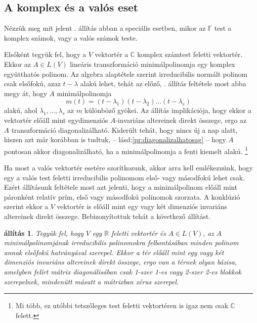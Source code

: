 \documentclass[a4paper, showtrims]{memoir}
\theoremstyle{plain}
\newtheorem{proposition}{állítás}[chapter]
\theoremstyle{remark}
\theoremstyle{definition}
\begin{document}
\subsection{A komplex és a valós eset}
Nézzük meg mit jelent . állítás abban a speciális esetben,
mikor az $\mathbb{F}$ test a komplex számok, vagy a valós számok teste.

Elsőként tegyük fel, hogy a $V$ vektortér a $\mathbb{C}$ komplex számtest feletti vektortér.
Ekkor az $A\in L\left( V \right)$ lineáris transzformáció minimálpolinomja egy komplex együtthatós polinom.
Az algebra alaptétele szerint irreducibilis normált polinom csak elsőfokú, azaz $t-\lambda$ alakú lehet,
tehát az előző, . állítás feltétele most abba megy át, hogy $A$ minimálpolinomja
\[
	m\left( t \right)=\left( t-\lambda_1 \right)\left( t-\lambda_2 \right)\dots\left( t-\lambda_s \right)
\]
alakú, ahol $\lambda_1,\ldots,\lambda_s$ az $m$ különböző gyökei.
Az állítás implikációja, hogy ekkor a vektortér előáll mint egydimenziós $A$-invariáns
altereinek direkt összege, ergo az $A$ transzformáció diagonalizálható.
Kiderült tehát, hogy nincs új a nap alatt, hiszen azt már korábban is tudtuk, -- lásd:\ref{pr:diagonalizalhatosag} -- hogy $A$ pontosan akkor diagonalizálható, ha a minimálpolinomja a fenti kiemelt alakú.%
\footnote{
    Mi több, ez utóbbi tetszőleges test feletti vektortéren is igaz nem csak $\mathbb{C}$ felett.
}

Ha most a valós vektortér esetére szorítkozunk, akkor arra kell emlékeznünk, hogy
egy a valós test feletti irreducibilis polinomom első- vagy másodfokú lehet csak.
Ezért állításunk feltétele most azt jelenti, 
hogy a minimálpolinom előáll mint páronként relatív prím, első vagy másodfokú polinomok szorzata.
A konklúzió szerint ekkor a $V$ vektortér is előáll mint egy vagy két dimenziós invariáns altereinek direkt összege. Bebizonyítottuk tehát a következő állítást.
\begin{proposition}
	Tegyük fel, hogy $V$ egy $\mathbb{R}$ feletti vektortér és $A\in L\left( V \right)$,
    az $A$ minimálpolinomjának irreducibilis polinomokra felbontásában minden polinom annak elsőfokú hatványával szerepel.
    Ekkor a tér előáll mint egy vagy két dimenziós invariáns altereinek direkt összege,
    ergo van a térnek olyan bázisa, amelyben felírt mátrix diagonálisában csak 1-szer 1-es vagy 2-szer 2-es blokkok szerepelnek, mindenütt másutt a mátrixban zérus szerepel.
\end{proposition}
\end{document}
